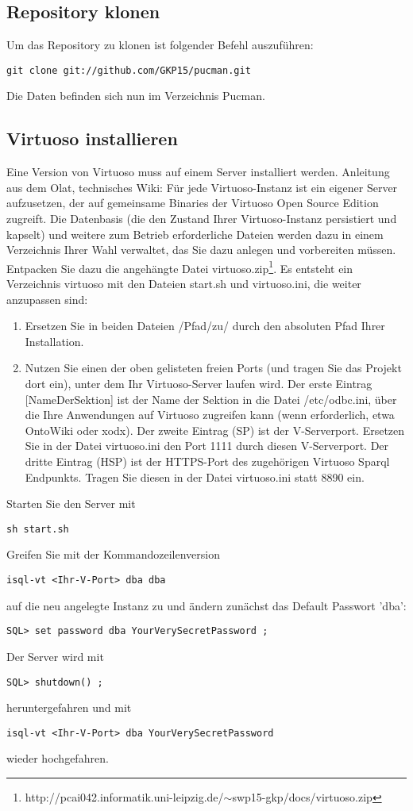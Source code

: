 \documentclass[11pt,a4paper]{article}
\begin{document}
\subsection{Repository klonen}
Um das Repository zu klonen ist folgender Befehl auszuführen:
\begin{lstlisting}
git clone git://github.com/GKP15/pucman.git
\end{lstlisting}
Die Daten befinden sich nun im Verzeichnis Pucman.
\newpage
\subsection{Virtuoso installieren}
Eine Version von Virtuoso muss auf einem Server installiert werden.
Anleitung aus dem Olat, technisches Wiki:
Für jede Virtuoso-Instanz ist ein eigener Server aufzusetzen, der auf gemeinsame Binaries der Virtuoso Open Source Edition zugreift. Die Datenbasis (die den Zustand Ihrer Virtuoso-Instanz persistiert und kapselt) und weitere zum Betrieb erforderliche Dateien werden dazu in einem Verzeichnis Ihrer Wahl verwaltet, das Sie dazu anlegen und vorbereiten müssen.
Entpacken Sie dazu die angehängte Datei virtuoso.zip\footnote{http://pcai042.informatik.uni-leipzig.de/$\sim$swp15-gkp/docs/virtuoso.zip}. Es entsteht ein Verzeichnis virtuoso mit den Dateien start.sh und virtuoso.ini, die weiter anzupassen sind:

\begin{enumerate}
	\item Ersetzen Sie in beiden Dateien /Pfad/zu/ durch den absoluten Pfad Ihrer Installation.
	\item Nutzen Sie einen der oben gelisteten freien Ports (und tragen Sie das Projekt dort ein), unter dem Ihr Virtuoso-Server laufen wird. Der erste Eintrag [NameDerSektion] ist der Name der Sektion in die Datei /etc/odbc.ini, über die Ihre Anwendungen auf Virtuoso zugreifen kann (wenn erforderlich, etwa OntoWiki oder xodx). Der zweite Eintrag (SP) ist der V-Serverport. Ersetzen Sie in der Datei virtuoso.ini den Port 1111 durch diesen V-Serverport. Der dritte Eintrag (HSP) ist der HTTPS-Port des zugehörigen Virtuoso Sparql Endpunkts. Tragen Sie diesen in der Datei virtuoso.ini statt 8890 ein.
\end{enumerate}
Starten Sie den Server mit
\begin{lstlisting}
sh start.sh
\end{lstlisting}
Greifen Sie mit der Kommandozeilenversion
\begin{lstlisting}
isql-vt <Ihr-V-Port> dba dba
\end{lstlisting}
auf die neu angelegte Instanz zu und ändern zunächst das Default Passwort 'dba':
\begin{lstlisting}
SQL> set password dba YourVerySecretPassword ;
\end{lstlisting}
Der Server wird mit
\begin{lstlisting}
SQL> shutdown() ;
\end{lstlisting}
heruntergefahren und mit
\begin{lstlisting}
isql-vt <Ihr-V-Port> dba YourVerySecretPassword
\end{lstlisting}
wieder hochgefahren.
\end{document}
